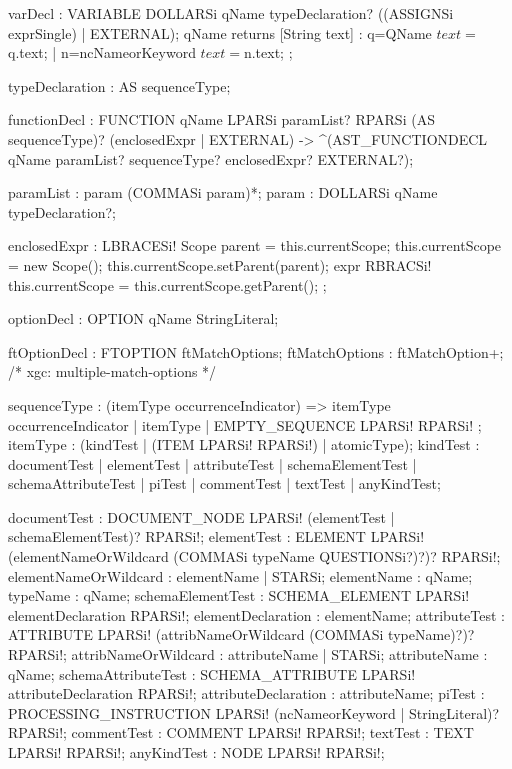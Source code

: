 varDecl : VARIABLE DOLLARSi qName typeDeclaration? 
          ((ASSIGNSi exprSingle) | EXTERNAL);
  qName returns [String text] : q=QName {$text = $q.text;}
                              | n=ncNameorKeyword {$text = $n.text;}
        ;

typeDeclaration : AS sequenceType;
  
functionDecl : FUNCTION qName LPARSi paramList? RPARSi 
               (AS sequenceType)? (enclosedExpr | EXTERNAL)
               -> ^(AST_FUNCTIONDECL qName paramList?
                                           sequenceType?
                                           enclosedExpr?
                                           EXTERNAL?);


paramList : param (COMMASi param)*;
  param : DOLLARSi qName typeDeclaration?;

enclosedExpr :
  LBRACESi! {Scope parent = this.currentScope;
             this.currentScope = new Scope();
             this.currentScope.setParent(parent); }
  expr
  RBRACSi! {this.currentScope = this.currentScope.getParent(); }
;

optionDecl : OPTION qName StringLiteral;

ftOptionDecl : FTOPTION ftMatchOptions;
  ftMatchOptions : ftMatchOption+; /* xgc: multiple-match-options */

sequenceType : (itemType occurrenceIndicator) 
                => itemType occurrenceIndicator
              | itemType
              | EMPTY_SEQUENCE LPARSi! RPARSi!
             ;
itemType : (kindTest | (ITEM LPARSi! RPARSi!) | atomicType);
  kindTest : documentTest
            | elementTest
            | attributeTest
            | schemaElementTest
            | schemaAttributeTest
            | piTest
            | commentTest
            | textTest
            | anyKindTest;

documentTest : DOCUMENT_NODE LPARSi! 
               (elementTest | schemaElementTest)? RPARSi!;
  elementTest : ELEMENT LPARSi! (elementNameOrWildcard 
                (COMMASi typeName QUESTIONSi?)?)? RPARSi!;
    elementNameOrWildcard : elementName | STARSi;
      elementName : qName;
    typeName : qName;
  schemaElementTest : SCHEMA_ELEMENT LPARSi! 
                      elementDeclaration RPARSi!;
    elementDeclaration : elementName;
      attributeTest : ATTRIBUTE LPARSi! 
                      (attribNameOrWildcard (COMMASi typeName)?)? 
                      RPARSi!;
        attribNameOrWildcard : attributeName | STARSi;
          attributeName : qName;
      schemaAttributeTest : SCHEMA_ATTRIBUTE LPARSi! 
                            attributeDeclaration RPARSi!;
        attributeDeclaration : attributeName;
      piTest : PROCESSING_INSTRUCTION LPARSi! 
               (ncNameorKeyword | StringLiteral)? RPARSi!;
      commentTest : COMMENT LPARSi! RPARSi!;
      textTest : TEXT LPARSi! RPARSi!;
      anyKindTest : NODE LPARSi! RPARSi!;

